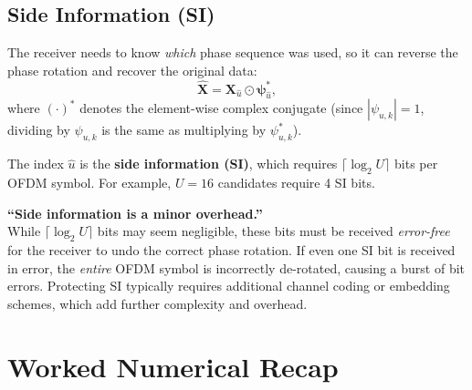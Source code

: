 \subsection{Side Information (SI)}

The receiver needs to know \emph{which} phase sequence was used, so it can reverse the phase rotation and recover the original data:
\begin{equation*}
    \hat{\bm{X}} = \bm{X}_{\hat{u}} \odot \bm{\psi}_{\hat{u}}^{*},
\end{equation*}
where $(\cdot)^{*}$ denotes the element-wise complex conjugate (since $|\psi_{u,k}|=1$, dividing by $\psi_{u,k}$ is the same as multiplying by $\psi_{u,k}^{*}$).

The index $\hat{u}$ is the \textbf{side information (SI)}, which requires $\lceil\log_2 U\rceil$ bits per OFDM symbol.  For example, $U=16$ candidates require 4 SI bits.

\begin{misconception}
    \textbf{``Side information is a minor overhead.''} \\
    While $\lceil\log_2 U\rceil$ bits may seem negligible, these bits must be received \emph{error-free} for the receiver to undo the correct phase rotation.  If even one SI bit is received in error, the \emph{entire} OFDM symbol is incorrectly de-rotated, causing a burst of bit errors. Protecting SI typically requires additional channel coding or embedding schemes, which add further complexity and overhead.
\end{misconception}


\section{Worked Numerical Recap}

